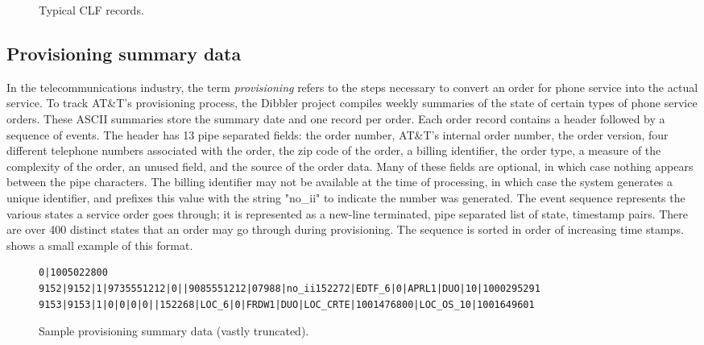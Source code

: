 \documentclass{sig-alternate}
\begin{document}
\begin{figure*}
\begin{small}
\begin{center}
\begin{code}

\end{code}
\label{figure:clf-records}
\caption{Typical CLF records.}
\end{center}
\end{small}
\end{figure*}


\subsection{Provisioning summary data}
In the telecommunications industry, the term \textit{provisioning} refers to the steps necessary to convert an order for phone service into the actual 
service.  
To track AT\&T's provisioning process, the Dibbler project compiles
weekly summaries of the state of certain types of phone service orders.  
These ASCII summaries store the summary date and one record per order.
Each order record contains a header followed by a sequence of events.
The header has 13 pipe separated fields: the order number, AT\&T's
internal order number, the order version, four different telephone
numbers associated with the order, the zip code of the order, a
billing identifier, the order type, a measure of the complexity of the
order, an unused field, and the source of the order data.  Many of
these fields are optional, in which case nothing appears between the
pipe characters.  The billing identifier may not be available at the
time of processing, in which case the system generates a unique
identifier, and prefixes this value with the string "no\_ii" to
indicate the number was generated. The event sequence represents the
various states a service order goes through; it is represented as a
new-line terminated, pipe separated list of state, timestamp pairs.
There are over 400 distinct states that an order may go through during
provisioning.  The sequence is sorted in order of increasing time
stamps.  shows a small example of
this format.
\begin{figure*}
\begin{small}
\begin{center}
\begin{verbatim}
0|1005022800
9152|9152|1|9735551212|0||9085551212|07988|no_ii152272|EDTF_6|0|APRL1|DUO|10|1000295291
9153|9153|1|0|0|0|0||152268|LOC_6|0|FRDW1|DUO|LOC_CRTE|1001476800|LOC_OS_10|1001649601
\end{verbatim}
\label{figure:dibbler-records}
\caption{Sample provisioning summary data (vastly truncated).}
\end{center}
\end{small}
\end{figure*}
\end{document}
